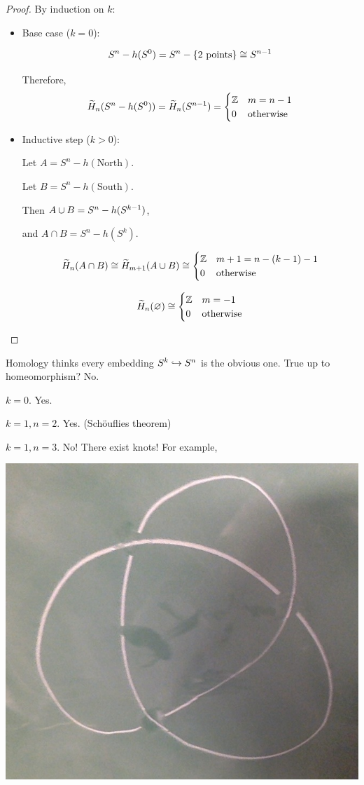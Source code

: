 \documentclass[11pt,leqno,oneside]{amsart}
\numberwithin{thm}{section}
\renewcommand{\null}{\varnothing}
\newcommand{\rhoml}[1][n]{\widetilde{H}_{#1}}
\begin{document}
\begin{proof}
  By induction on $k$:

  \begin{itemize}
    \item Base case ($k=0$):

    $$S^n - h(S^0) = S^n - \{\text{2 points}\} \mathrel{\cong} S^{n-1}$$

    Therefore, $$\rhoml(S^n - h(S^0)) = \rhoml(S^{n-1}) = \begin{cases}
      \Z &\text{$m = n - 1$} \\
      0 &\text{otherwise}
    \end{cases}$$

    \item Inductive step ($k > 0$):

    Let $A = S^n - h(\text{North})$.

    Let $B = S^n - h(\text{South})$.

    Then $A \cup B = S^n - h(S^{k-1})$,

    and $A \cap B = S^n - h(S^{k})$.

    $$\rhoml(A \cap B) \isom \rhoml[m+1](A \union B) \isom \begin{cases}
      \Z &\text{$m + 1 = n - (k-1) - 1$} \\
      0 &\text{otherwise}
    \end{cases}$$

    $$\rhoml(\null) \isom \begin{cases}
      \Z &\text{$m = -1$} \\
      0 &\text{otherwise}
    \end{cases}$$
  \end{itemize}
\end{proof}

Homology thinks every embedding $S^k \hookrightarrow S^n$ is the obvious one.  True up to homeomorphism?  No.

$k = 0$.  Yes.

$k = 1, n = 2$.  Yes.  (Schöuflies theorem)

$k = 1, n = 3$.  No!  There exist knots!  For example,

\includegraphics[scale=0.1]{images/trefoil}
\end{document}
